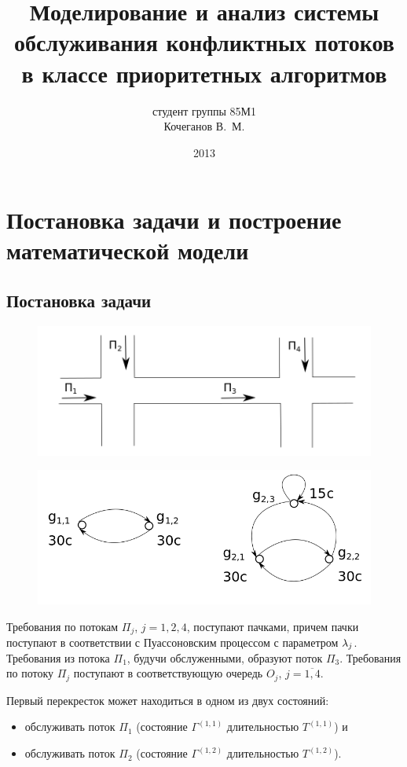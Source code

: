 \documentclass[a4paper,14pt,russian]{article}
\title{Моделирование и анализ системы обслуживания конфликтных потоков в классе приоритетных алгоритмов}
\author{студент группы 85М1\\ Кочеганов В.~М.}
\date{2013}
\newcommand{\gam}[2]{\Gamma^{\left( #1 , #2 \right)} }
\newcommand{\T}[2]{T^{\left( #1 , #2 \right)} }
\begin{document}
\section{Постановка задачи и построение математической модели}
\subsection{Постановка задачи}

\begin{figure}[h]
\includegraphics[scale=0.5]{Crossroads.png} 
\end{figure}

\begin{figure}[h]
\includegraphics[scale=0.5]{SystemStates.png} 
\end{figure}



Требования по потокам $\Pi_j$, $j=1,2,4$, поступают пачками, причем пачки поступают в соответствии с Пуассоновским процессом с параметром $\lambda_j$. Требования из потока $\Pi_1$, будучи обслуженными, образуют поток $\Pi_3$.
Требования по потоку $\Pi_j$ поступают в соответствующую очередь $O_j$, $j=\overline{1,4}$.

Первый перекресток может находиться в одном из двух состояний:
\begin{itemize}
\item обслуживать поток $\Pi_1$ (состояние $\gam{1}{1}$ длительностью $\T{1}{1}$) и 
\item
обслуживать поток $\Pi_2$ (состояние $\gam{1}{2}$ длительностью $\T{1}{2}$).
\end{itemize}
\end{document}
